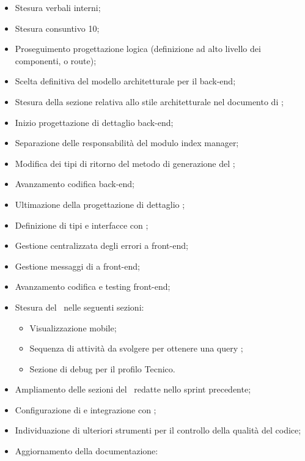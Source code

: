 \begin{itemize}
  \item Stesura verbali interni;
  \item Stesura consuntivo  10;
  \item Proseguimento progettazione logica  (definizione ad alto livello dei componenti, o route);
  \item Scelta definitiva del modello architetturale per il back-end;
  \item Stesura della sezione relativa allo stile architetturale nel documento di \ST;
  \item Inizio progettazione di dettaglio back-end;
  \item Separazione delle responsabilità del modulo index manager;
  \item Modifica dei tipi di ritorno del metodo di generazione del ;
  \item Avanzamento codifica back-end;
  \item Ultimazione della progettazione di dettaglio ;
  \item Definizione di tipi e interfacce con ;
  \item Gestione centralizzata degli errori a front-end;
  \item Gestione messaggi di  a front-end;
  \item Avanzamento codifica e testing front-end;
  \item Stesura del \MU\ nelle seguenti sezioni:
  \begin{itemize}
    \item Visualizzazione mobile;
    \item Sequenza di attività da svolgere per ottenere una query ;
    \item Sezione di debug per il profilo Tecnico.
  \end{itemize}
  \item Ampliamento delle sezioni del \MU\ redatte nello sprint precedente;
  \item Configurazione di  e integrazione con ;
  \item Individuazione di ulteriori strumenti per il controllo della qualità del codice;
  \item Aggiornamento della documentazione:
\end{itemize}

